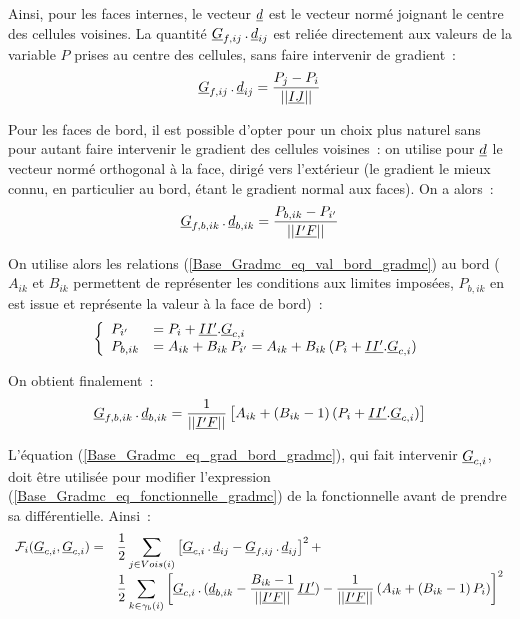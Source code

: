 Ainsi, pour les faces internes, le vecteur $\underline{d}$ est le vecteur norm\'e joignant
le centre des cellules voisines. La quantit\'e
$\underline{G}_{f,ij}\,.\,\underline{d}_{ij}$ est reli\'ee directement aux
valeurs de la variable $P$ prises au centre des cellules, sans faire intervenir
de gradient~:
\begin{equation}
\underline{G}_{f,ij}\,.\,\underline{d}_{ij}=\frac{P_j-P_i}{||\underline{IJ}||}
\end{equation}

Pour les faces de bord, il est possible d'opter pour un choix plus naturel sans pour
autant faire intervenir le gradient des cellules voisines~: on utilise pour
$\underline{d}$ le vecteur
norm\'e orthogonal \`a la face, dirig\'e vers l'ext\'erieur (le gradient le
mieux connu, en particulier au bord, \'etant le gradient normal aux faces).
On a alors~:
\begin{equation}
\underline{G}_{f,b,ik}\,.\,\underline{d}_{b,ik}=\frac{P_{b,ik}-P_{i'}}{||\underline{I'F}||}
\end{equation}

On utilise alors les relations (\ref{Base_Gradmc_eq_val_bord_gradmc}) au bord ($A_{ik}$ et $B_{ik}$
permettent de
repr\'esenter les conditions aux limites impos\'ees, $P_{b,ik}$ en est issue et
repr\'esente la valeur \`a la face de bord)~:
\begin{equation}
\left\{\begin{array}{ll}\label{Base_Gradmc_eq_val_bord_gradmc}
P_{i'}&=P_{i}+\underline{II'}.\underline{G}_{c,i}\\
P_{b,ik}&=A_{ik}+B_{ik}\,P_{i'}=A_{ik}+B_{ik}\,(P_{i}+\underline{II'}.\underline{G}_{c,i})
\end{array}\right.
\end{equation}

On obtient finalement~:
\begin{equation}\label{Base_Gradmc_eq_grad_bord_gradmc}
\underline{G}_{f,b,ik}\,.\,\underline{d}_{b,ik}
=\frac{1}{||\underline{I'F}||}\left[A_{ik}+(B_{ik}-1)\,(P_{i}+\underline{II'}.\underline{G}_{c,i})\right]
\end{equation}

L'\'equation (\ref{Base_Gradmc_eq_grad_bord_gradmc}), qui fait intervenir $\underline{G}_{c,i}$,
doit \^etre utilis\'ee pour modifier
l'expression (\ref{Base_Gradmc_eq_fonctionnelle_gradmc}) de la fonctionnelle avant de prendre sa
diff\'erentielle. Ainsi~:
\begin{equation}\label{Base_Gradmc_eq_fonctionnelle_mod_gradmc}
\begin{array}{ll}
\mathcal{F}_i(\underline{G}_{c,i},\underline{G}_{c,i})=&
\displaystyle\frac{1}{2}\sum\limits_{j\in Vois(i)}\left[
\underline{G}_{c,i}\,.\,\underline{d}_{ij}-\underline{G}_{f,ij}\,.\,\underline{d}_{ij}
\right]^2+\\
&\displaystyle\frac{1}{2}\sum\limits_{k\in \gamma_b(i)}\left[
\underline{G}_{c,i}\,.\,(\underline{d}_{b,ik}-\frac{B_{ik}-1}{||\underline{I'F}||}\,\underline{II'})
-\frac{1}{||\underline{I'F}||}\left(A_{ik}+(B_{ik}-1)\,P_{i}\right)
\right]^2
\end{array}
\end{equation}





